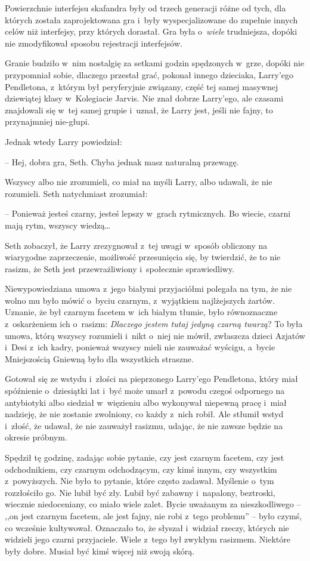 \documentclass[oneside,polish,11pt,sfheadings]{mwbk}
\begin{document}
Powierzchnie interfejsu skafandra były od trzech generacji różne od
tych, dla których została zaprojektowana gra i~były wyspecjalizowane do
zupełnie innych celów niż interfejsy, przy których dorastał. Gra była o~\textit{wiele }trudniejsza, dopóki nie zmodyfikował sposobu rejestracji
interfejsów.

Granie budziło w~nim nostalgię za setkami godzin spędzonych w~grze,
dopóki nie przypomniał sobie, dlaczego przestał grać, pokonał innego
dzieciaka, Larry'ego Pendletona, z~którym był peryferyjnie związany,
część tej samej masywnej dziewiątej klasy w~Kolegiacie Jarvis. Nie znał
dobrze Larry'ego, ale czasami znajdowali się w~tej samej grupie i~uznał,
że Larry jest, jeśli nie fajny, to przynajmniej nie-głupi.

Jednak wtedy Larry powiedział: 

-- Hej, dobra gra, Seth. Chyba jednak masz
naturalną przewagę.

Wszyscy albo nie zrozumieli, co miał na myśli Larry, albo udawali, że
nie rozumieli. Seth natychmiast zrozumiał: 

-- Ponieważ jesteś czarny,
jesteś lepszy w~grach rytmicznych. Bo wiecie, czarni mają rytm, wszyscy
wiedzą\ldots  

Seth zobaczył, że Larry zrezygnował z~tej uwagi w~sposób
obliczony na wiarygodne zaprzeczenie, możliwość przesunięcia się, by
twierdzić, że to nie rasizm, że Seth jest przewrażliwiony i~społecznie
sprawiedliwy.

Niewypowiedziana umowa z~jego białymi przyjaciółmi polegała na tym, że
nie wolno mu było mówić o~byciu czarnym, z~wyjątkiem najlżejszych
żartów. Uznanie, że był czarnym facetem w~ich białym tłumie, było
równoznaczne z~oskarżeniem ich o~rasizm: \textit{Dlaczego jestem tutaj
jedyną czarną twarzą}? To była umowa, którą wszyscy rozumieli i~nikt o~niej nie mówił, zwłaszcza dzieci Azjatów i~Desi z~ich kadry, ponieważ
wszyscy mieli nie zauważać wyścigu, a~bycie Mniejszością Gniewną było
dla wszystkich straszne.

Gotował się ze wstydu i~złości na pieprzonego Larry'ego Pendletona,
który miał spóźnienie o~dziesiątki lat i~być może umarł z~powodu czegoś
odpornego na antybiotyki albo siedział w~więzieniu albo wykonywał
niepewną pracę i~miał nadzieję, że nie zostanie zwolniony, co każdy z~nich robił. Ale stłumił wstyd i~złość, że udawał, że nie zauważył
rasizmu, udając, że nie zawsze będzie na okresie próbnym.

Spędził tę godzinę, zadając sobie pytanie, czy jest czarnym facetem, czy
jest odchodnikiem, czy czarnym odchodzącym, czy kimś innym, czy
wszystkim z~powyższych. Nie było to pytanie, które często zadawał.
Myślenie o~tym rozzłościło go. Nie lubił być zły. Lubił być zabawny i~napalony, beztroski, wiecznie niedoceniany, co miało wiele zalet. Bycie
uważanym za nieszkodliwego -- ,,on jest czarnym facetem, ale jest fajny,
nie robi z~tego problemu'' -- było czymś, co wcześnie kultywował.
Oznaczało to, że słyszał i~widział rzeczy, których nie widzieli jego
czarni przyjaciele. Wiele z~tego był zwykłym rasizmem. Niektóre były
dobre. Musiał być kimś więcej niż swoją skórą.
\end{document}

